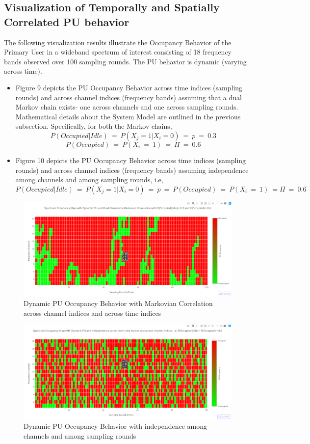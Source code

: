 \documentclass[12pt, draftcls, onecolumn]{IEEEtran}
\begin{document}
\subsection{Visualization of Temporally and Spatially Correlated PU behavior}
The following visualization results illustrate the Occupancy Behavior of the Primary User in a wideband spectrum of interest consisting of 18 frequency bands observed over 100 sampling rounds. The PU behavior is dynamic (varying across time).
\begin{itemize}
    \item Figure 9 depicts the PU Occupancy Behavior across time indices (sampling rounds) and across channel indices (frequency bands) assuming that a dual Markov chain exists- one across channels and one across sampling rounds. Mathematical details about the System Model are outlined in the previous subsection. Specifically, for both the Markov chains, 
    \[P(Occupied|Idle)\ =\ P(X_j = 1|X_i = 0)\ =\ p\ =\ 0.3\]
    \[P(Occupied)\ =\ P(X_i\ =\ 1)\ =\ \Pi\ =\ 0.6\]
    \item Figure 10 depicts the PU Occupancy Behavior across time indices (sampling rounds) and across channel indices (frequency bands) assuming independence among channels and among sampling rounds, i.e,
    \[P(Occupied|Idle)\ =\ P(X_j = 1|X_i = 0)\ =\ p\ =\ P(Occupied)\ =\ P(X_i\ =\ 1)\ = \Pi\ =\ 0.6\]
\end{itemize}
\begin{figure}[t]
\includegraphics[width=1.0\textwidth]{Spectrum_Occupancy_SpatioTemporal_Markovian_Correlation.png}
\caption{Dynamic PU Occupancy Behavior with Markovian Correlation across channel indices and across time indices}
\label{fig:mesh9}
\centering
\end{figure}
\begin{figure}[t]
\includegraphics[width=1.0\textwidth]{Spectrum_Occupancy_SpatioTemporal_Independence_2.png}
\caption{Dynamic PU Occupancy Behavior with independence among channels and among sampling rounds}
\label{fig:mesh10}
\centering
\end{figure}
\end{document}
